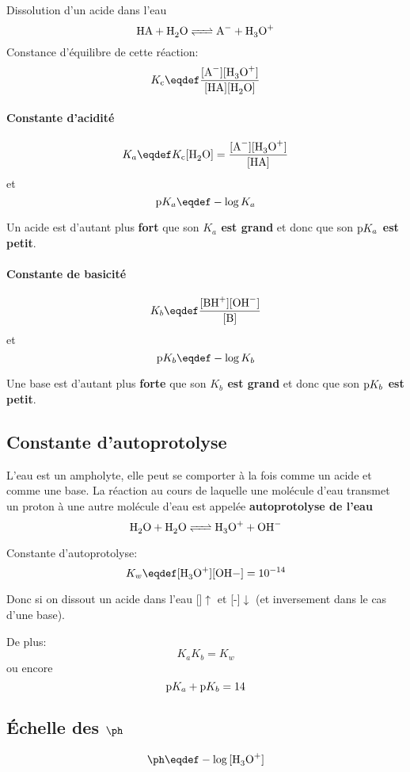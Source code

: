 Dissolution d'un acide dans l'eau
\[ \ce{HA + H2O <=> A- + H3O+} \]
Constance d'équilibre de cette réaction:
\[ \kc\eqdef\frac{[\ce{A-}][\ce{H3O+}]}{[\ce{HA}][\ce{H2O}]} \]

\paragraph{Constante d'acidité}
\[ K_a\eqdef\kc[\ce{H2O}]=\frac{[\ce{A-}][\ce{H3O+}]}{[\ce{HA}]} \]
et
\[ \pka\eqdef-\log{K_a} \]

Un acide est d'autant plus \textbf{fort} que son \textbf{$K_a$ est grand} et donc que son \textbf{$\mathrm{p}K_a$ est petit}.\\

\paragraph{Constante de basicité}
\[ K_b\eqdef\frac{[\ce{BH+}][\ce{OH-}]}{[\ce{B}]} \]
et
\[ \pkb\eqdef-\log{K_b} \]

Une base est d'autant plus \textbf{forte} que son \textbf{$K_b$ est grand} et donc que son \textbf{$\mathrm{p}K_b$ est petit}.\\

\subsection{Constante d'autoprotolyse}
L'eau est un \textrm{ampholyte},
elle peut se comporter à la fois comme un acide et comme une base.
La réaction au cours de laquelle une molécule d'eau transmet un proton à une autre molécule d'eau est appelée \textbf{autoprotolyse de l'eau}
\[\ce{H2O + H2O <=> H3O+ + OH-}\]

Constante d'autoprotolyse:
\[ K_w\eqdef[\ce{H3O+}][\ce{OH}-]=10^{-14} \]

Donc si on dissout un acide dans l'eau []$\uparrow$ et [-]$\downarrow$ (et inversement dans le cas d'une base).

De plus:
\[ K_aK_b=K_w \]
ou encore
\[ \mathrm{p}K_a+\mathrm{p}K_b=14 \]

\subsection{\'Echelle des $\ph$}

$$\ph\eqdef-\log{[\ce{H3O+}]}$$

